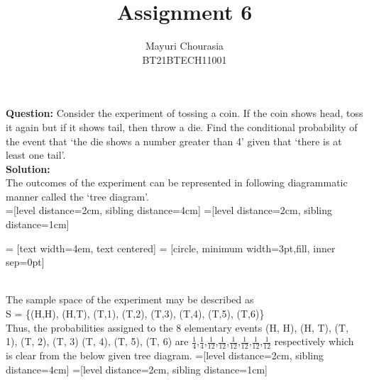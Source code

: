 \documentclass[journal,12pt,twocolumn]{IEEEtran}
\title{Assignment 6}
\author{Mayuri Chourasia\\BT21BTECH11001}
\date{}
\newcommand{\question}{\noindent \textbf{Question: }}
\newcommand{\solution}{\noindent \textbf{Solution: }}
\begin{document}
\maketitle
\question Consider the experiment of tossing a coin. If the coin shows head, toss it
again but if it shows tail, then throw a die. Find the
conditional probability of the event that ‘the die shows
a number greater than 4’ given that ‘there is at least
one tail’.\\
\solution \\
The outcomes of the experiment can be
represented in following diagrammatic manner called
the ‘tree diagram’.\\
=[level distance=2cm, sibling distance=4cm]
=[level distance=2cm, sibling distance=1cm]

 = [text width=4em, text centered]
 = [circle, minimum width=3pt,fill, inner sep=0pt] 
\\

The sample space of the experiment may be
described as\\
    S = \{(H,H), (H,T), (T,1), (T,2), (T,3), (T,4), (T,5), (T,6)\}\\
Thus, the probabilities assigned to the 8 elementary
events (H, H), (H, T), (T, 1), (T, 2), (T, 3) (T, 4), (T, 5), (T, 6) are $\frac{1}{4}$,$\frac{1}{4}$,$\frac{1}{12}$,$\frac{1}{12}$,$\frac{1}{12}$,$\frac{1}{12}$,$\frac{1}{12}$,$\frac{1}{12}$ respectively which is clear from the below given tree diagram.
=[level distance=2cm, sibling distance=4cm]
=[level distance=2cm, sibling distance=1cm]
\end{document}
